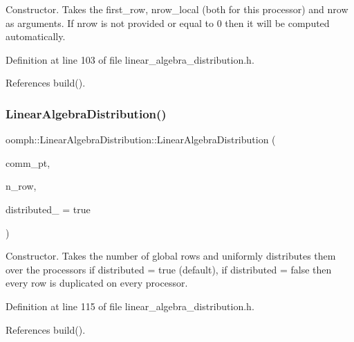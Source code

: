 Constructor. Takes the first\+\_\+row, nrow\+\_\+local (both for this processor) and nrow as arguments. If nrow is not provided or equal to 0 then it will be computed automatically. 



Definition at line 103 of file linear\+\_\+algebra\+\_\+distribution.\+h.



References build().

\mbox{\label{classoomph_1_1LinearAlgebraDistribution_a5bb5b3cfbe3b635779066e5a3e00be6e}} 
\subsubsection{\texorpdfstring{Linear\+Algebra\+Distribution()}{LinearAlgebraDistribution()}\hspace{0.1cm}{\footnotesize\ttfamily [5/7]}}
{\footnotesize\ttfamily oomph\+::\+Linear\+Algebra\+Distribution\+::\+Linear\+Algebra\+Distribution (\begin{DoxyParamCaption}\item[{const \hyperlink{classoomph_1_1OomphCommunicator}{Oomph\+Communicator} $\ast$const}]{comm\+\_\+pt,  }\item[{const unsigned \&}]{n\+\_\+row,  }\item[{const bool \&}]{distributed\+\_\+ = {\ttfamily true} }\end{DoxyParamCaption})\hspace{0.3cm}{\ttfamily [inline]}}



Constructor. Takes the number of global rows and uniformly distributes them over the processors if distributed = true (default), if distributed = false then every row is duplicated on every processor. 



Definition at line 115 of file linear\+\_\+algebra\+\_\+distribution.\+h.



References build().

\mbox{\label{classoomph_1_1LinearAlgebraDistribution_ad1857bf3eaab8d87991b651f7a52d4ff}} 
